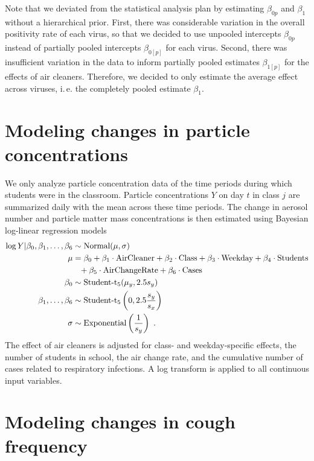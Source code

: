 \documentclass[fleqn,11pt]{wlscirep_supp}
\newcommand\ie{i.\,e.\xspace}
\begin{document}
Note that we deviated from the statistical analysis plan by estimating $\beta_{0p}$ and $\beta_1$ without a hierarchical prior. First, there was considerable variation in the overall positivity rate of each virus, so that we decided to use unpooled intercepts $\beta_{0p}$ instead of partially pooled intercepts $\beta_{0[p]}$ for each virus. Second, there was insufficient variation in the data to inform partially pooled estimates $\beta_{1[p]}$ for the effects of air cleaners. Therefore, we decided to only estimate the average effect across viruses, \ie the completely pooled estimate $\beta_1$.  

\section{Modeling changes in particle concentrations}\label{sec:env-regression-model}

We only analyze particle concentration data of the time periods during which students were in the classroom. Particle concentrations $Y$ on day $t$ in class $j$ are summarized daily with the mean across these time periods. The change in aerosol number and particle matter mass concentrations is then estimated using Bayesian log-linear regression models
\begin{align*}
    \log Y | \beta_0, \beta_1, \dots, \beta_6 &\sim \text{Normal}(\mu,\sigma) \\
    \mu &= \beta_0 + \beta_1 \cdot \text{AirCleaner} + \beta_2 \cdot \text{Class} + \beta_3 \cdot \text{Weekday} + \beta_4 \cdot \text{Students} \\
    &\hphantom{= } + \beta_5 \cdot \text{AirChangeRate} + \beta_6 \cdot \text{Cases} \\
    \beta_0 &\sim \text{Student-t}_5(\mu_y, 2.5s_{y}) \\
    \beta_1, \dots, \beta_6 &\sim \text{Student-t}_5\left(0, 2.5\frac{s_{y}}{s_{x}}\right) \\
    \sigma &\sim \text{Exponential}\left(\frac{1}{s_{y}}\right)~.
\end{align*}
The effect of air cleaners is adjusted for class- and weekday-specific effects, the number of students in school, the air change rate, and the cumulative number of cases related to respiratory infections. A log transform is applied to all continuous input variables. 

\clearpage

\section{Modeling changes in cough frequency}\label{sec:aud-regression-model}
\end{document}

